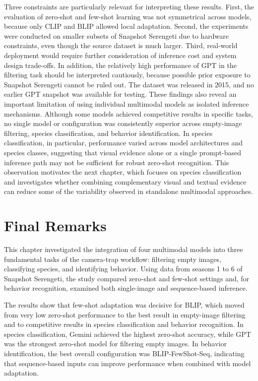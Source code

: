 Three constraints are particularly relevant for interpreting these results. First, the evaluation of zero-shot and few-shot learning was not symmetrical across models, because only CLIP and BLIP allowed local adaptation. Second, the experiments were conducted on smaller subsets of Snapshot Serengeti due to hardware constraints, even though the source dataset is much larger. Third, real-world deployment would require further consideration of inference cost and system design trade-offs. In addition, the relatively high performance of GPT in the filtering task should be interpreted cautiously, because possible prior exposure to Snapshot Serengeti cannot be ruled out. The dataset was released in 2015, and no earlier GPT snapshot was available for testing.
These findings also reveal an important limitation of using individual multimodal models as isolated inference mechanisms. Although some models achieved competitive results in specific tasks, no single model or configuration was consistently superior across empty-image filtering, species classification, and behavior identification. In species classification, in particular, performance varied across model architectures and species classes, suggesting that visual evidence alone or a single prompt-based inference path may not be sufficient for robust zero-shot recognition. This observation motivates the next chapter, which focuses on species classification and investigates whether combining complementary visual and textual evidence can reduce some of the variability observed in standalone multimodal approaches.
\section{Final Remarks}

This chapter investigated the integration of four multimodal models into three fundamental tasks of the camera-trap workflow: filtering empty images, classifying species, and identifying behavior. Using data from seasons 1 to 6 of Snapshot Serengeti, the study compared zero-shot and few-shot settings and, for behavior recognition, examined both single-image and sequence-based inference.

The results show that few-shot adaptation was decisive for BLIP, which moved from very low zero-shot performance to the best result in empty-image filtering and to competitive results in species classification and behavior recognition. In species classification, Gemini achieved the highest zero-shot accuracy, while GPT was the strongest zero-shot model for filtering empty images. In behavior identification, the best overall configuration was BLIP-FewShot-Seq, indicating that sequence-based inputs can improve performance when combined with model adaptation.

